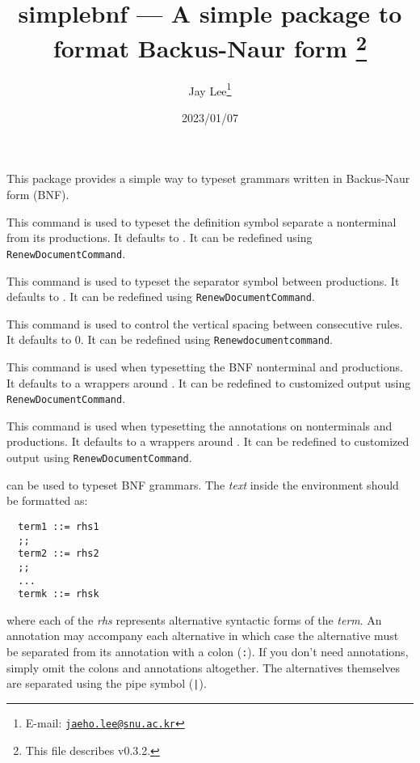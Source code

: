 \documentclass[a4paper]{article}
\title{%
  \textsf{simplebnf} --- A simple package to format Backus-Naur form%
  \footnote{This file describes v0.3.2.}}
\author{Jay Lee\footnote{E-mail: %
  \href{mailto:jaeho.lee@snu.ac.kr}{\texttt{jaeho.lee@snu.ac.kr}}}}
\date{2023/01/07}
\begin{document}
\maketitle

This package provides a simple way to typeset grammars written in Backus-Naur form (BNF).

\begin{presentcommand}
\end{presentcommand}
This command is used to typeset the definition symbol separate a nonterminal from its productions. It defaults to \SimpleBNFDefEq. It can be redefined using \verb|RenewDocumentCommand|.

\begin{presentcommand}
\end{presentcommand}
This command is used to typeset the separator symbol between productions. It defaults to \SimpleBNFDefOr. It can be redefined using \verb|RenewDocumentCommand|.

\begin{presentcommand}
\end{presentcommand}
This command is used to control the vertical spacing between consecutive rules.
It defaults to 0.
It can be redefined using \verb/Renewdocumentcommand/.

\begin{presentcommand}
\end{presentcommand}
This command is used when typesetting the BNF nonterminal and productions. It defaults to a wrappers around . It can be redefined to customized output using \verb|RenewDocumentCommand|.

\begin{presentcommand}
\end{presentcommand}
This command is used when typesetting the annotations on nonterminals and productions. It defaults to a wrappers around . It can be redefined to customized output using \verb|RenewDocumentCommand|.

\begin{presentcommand}
\end{presentcommand}
can be used to typeset BNF grammars. The \textit{text} inside the environment should be formatted as:
\begin{verbatim}
  term1 ::= rhs1
  ;;
  term2 ::= rhs2
  ;;
  ...
  termk ::= rhsk
\end{verbatim}
where each of the \textit{rhs} represents alternative syntactic forms of the \textit{term}. An annotation may accompany each alternative in which case the alternative must be separated from its annotation with a colon (\verb/:/). If you don't need annotations, simply omit the colons and annotations altogether. The alternatives themselves are separated using the pipe symbol (\verb/|/).
\end{document}
